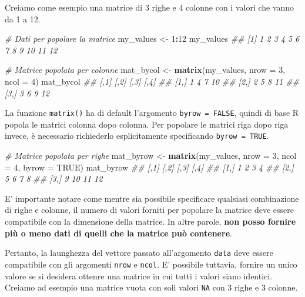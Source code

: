 \documentclass[
]{book}
\newenvironment{Shaded}{\begin{snugshade}}{\end{snugshade}}
\newcommand{\CommentTok}[1]{\textcolor[rgb]{0.56,0.35,0.01}{\textit{#1}}}
\newcommand{\DataTypeTok}[1]{\textcolor[rgb]{0.13,0.29,0.53}{#1}}
\newcommand{\DecValTok}[1]{\textcolor[rgb]{0.00,0.00,0.81}{#1}}
\newcommand{\KeywordTok}[1]{\textcolor[rgb]{0.13,0.29,0.53}{\textbf{#1}}}
\newcommand{\NormalTok}[1]{#1}
\newcommand{\OperatorTok}[1]{\textcolor[rgb]{0.81,0.36,0.00}{\textbf{#1}}}
\newcommand{\OtherTok}[1]{\textcolor[rgb]{0.56,0.35,0.01}{#1}}
\newcommand{\StringTok}[1]{\textcolor[rgb]{0.31,0.60,0.02}{#1}}
\begin{document}
Creiamo come esempio una matrice di 3 righe e 4 colonne con i valori che vanno da 1 a 12.

\begin{Shaded}
\begin{Highlighting}[]
\CommentTok{# Dati per popolare la matrice}
\NormalTok{my_values <-}\StringTok{ }\DecValTok{1}\OperatorTok{:}\DecValTok{12}
\NormalTok{my_values}
\CommentTok{##  [1]  1  2  3  4  5  6  7  8  9 10 11 12}

\CommentTok{# Matrice popolata per colonne}
\NormalTok{mat_bycol <-}\StringTok{ }\KeywordTok{matrix}\NormalTok{(my_values, }\DataTypeTok{nrow =} \DecValTok{3}\NormalTok{, }\DataTypeTok{ncol =} \DecValTok{4}\NormalTok{)}
\NormalTok{mat_bycol}
\CommentTok{##      [,1] [,2] [,3] [,4]}
\CommentTok{## [1,]    1    4    7   10}
\CommentTok{## [2,]    2    5    8   11}
\CommentTok{## [3,]    3    6    9   12}
\end{Highlighting}
\end{Shaded}

La funzione \texttt{matrix()} ha di default l'argomento \texttt{byrow\ =\ FALSE}, quindi di base R popola le matrici colonna dopo colonna. Per popolare le matrici riga dopo riga invece, è necessario richiederlo esplicitamente specificando \texttt{byrow\ =\ TRUE}.

\begin{Shaded}
\begin{Highlighting}[]
\CommentTok{# Matrice popolata per righe}
\NormalTok{mat_byrow <-}\StringTok{ }\KeywordTok{matrix}\NormalTok{(my_values, }\DataTypeTok{nrow =} \DecValTok{3}\NormalTok{, }\DataTypeTok{ncol =} \DecValTok{4}\NormalTok{, }\DataTypeTok{byrow =} \OtherTok{TRUE}\NormalTok{)}
\NormalTok{mat_byrow}
\CommentTok{##      [,1] [,2] [,3] [,4]}
\CommentTok{## [1,]    1    2    3    4}
\CommentTok{## [2,]    5    6    7    8}
\CommentTok{## [3,]    9   10   11   12}
\end{Highlighting}
\end{Shaded}

E' importante notare come mentre sia possibile specificare qualsiasi combinazione di righe e colonne, il numero di valori forniti per popolare la matrice deve essere compatibile con la dimensione della matrice. In altre parole, \textbf{non posso fornire più o meno dati di quelli che la matrice può contenere}.

Pertanto, la launghezza del vettore passato all'argomento \texttt{data} deve essere compatibile con gli argomenti \texttt{nrow} e \texttt{ncol}. E' possibile tuttavia, fornire un unico valore se si desidera ottenre una matrice in cui tutti i valori siano identici. Creiamo ad esempio una matrice vuota con soli valori \texttt{NA} con 3 righe e 3 colonne.
\end{document}
